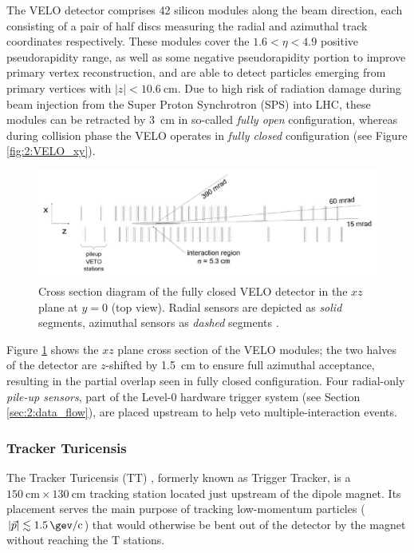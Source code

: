 The VELO detector comprises 42 silicon modules along the beam direction, each consisting of a pair of half discs measuring the radial and azimuthal track coordinates respectively. These modules cover the $1.6 < \eta < 4.9$ positive pseudorapidity range, as well as some negative pseudorapidity portion to improve primary vertex reconstruction, and are able to detect particles emerging from primary vertices with $|z| < \SI{10.6}{\centi\meter}$.
Due to high risk of radiation damage during beam injection from the Super Proton Synchrotron (SPS) into LHC, these modules can be retracted by \SI{3}{\centi\meter} in so-called \textit{fully open} configuration, whereas during collision phase the VELO operates in \textit{fully closed} configuration (see Figure \ref{fig:2:VELO_xy}).

\begin{figure}[t]
	\centering
	\includegraphics[width=\textwidth]{graphics/02-lhcb/VELO_xz.png}
	\caption[Cross section diagram of the VELO detector in the $xz$ plane.]{Cross section diagram of the fully closed VELO detector in the $xz$ plane at $y=0$ (top view). Radial sensors are depicted as \textit{solid} segments, azimuthal sensors as \textit{dashed} segments \cite{Barbosa-Marinho:504321}.}
	\label{fig:2:VELO_xz}
\end{figure}

Figure \ref{fig:2:VELO_xz} shows the $xz$ plane cross section of the VELO modules; the two halves of the detector are $z$-shifted by \SI{1.5}{\centi\meter} to ensure full azimuthal acceptance, resulting in the partial overlap seen in fully closed configuration.
Four radial-only \textit{pile-up sensors}, part of the Level-0 hardware trigger system (see Section \ref{sec:2:data_flow}), are placed upstream to help veto multiple-interaction events.



\subsubsection{Tracker Turicensis}
The Tracker Turicensis (TT) \cite{Gassner:728548}, formerly known as Trigger Tracker, is a $\SI{150}{\centi\meter} \times \SI{130}{\centi\meter}$ tracking station located just upstream of the dipole magnet.
Its placement serves the main purpose of tracking low-momentum particles ($|\vec{p}| \lesssim \SI{1.5}{\gev\per c}$) that would otherwise be bent out of the detector by the magnet without reaching the T stations.

